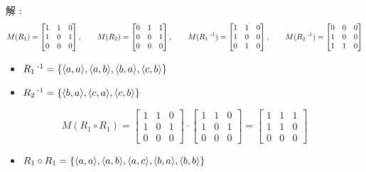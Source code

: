 {{{{    解 : $$
      M(R_1) = \begin{bmatrix}
        1 & 1 & 0 \\
        1 & 0 & 1 \\
        0 & 0 & 0
      \end{bmatrix},\qquad
      M(R_2) = \begin{bmatrix}
        0 & 1 & 1 \\
        0 & 0 & 1 \\
        0 & 0 & 0
      \end{bmatrix},\qquad
      M(R_1\operatorname{^{-1}}) = \begin{bmatrix}
        1 & 1 & 0 \\
        1 & 0 & 0 \\
        0 & 1 & 0
      \end{bmatrix},\qquad
      M(R_2\operatorname{^{-1}}) = \begin{bmatrix}
        0 & 0 & 0 \\
        1 & 0 & 0 \\
        1 & 1 & 0
      \end{bmatrix}
    $$
    \begin{itemize}
      \item $R_1\operatorname{^{-1}} = \left\{ \langle a,a\rangle,\langle a,b\rangle,\langle b,a\rangle,\langle c,b\rangle \right\}$
      \item $R_2\operatorname{^{-1}} = \left\{ \langle b,a\rangle,\langle c,a\rangle,\langle c,b\rangle \right\}$
    \end{itemize}
    $$
      M(R_1 \circ R_1) = \begin{bmatrix}
        1 & 1 & 0 \\
        1 & 0 & 1 \\
        0 & 0 & 0
      \end{bmatrix}
      \cdot
      \begin{bmatrix}
        1 & 1 & 0 \\
        1 & 0 & 1 \\
        0 & 0 & 0
      \end{bmatrix}
      =
      \begin{bmatrix}
        1 & 1 & 1 \\
        1 & 1 & 0 \\
        0 & 0 & 0
      \end{bmatrix}
    $$
    \begin{itemize}
      \item $R_1 \circ R_1 = \left\{ \langle a,a\rangle,\langle a,b\rangle,\langle a,c\rangle,\langle b,a\rangle,\langle b,b\rangle \right\}$
    \end{itemize}
}}}}
